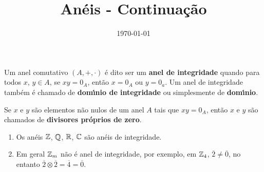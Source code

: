 \documentclass{beamer}
\title{Anéis - Continuação}
\author[\autor]{\autor}
\institute[\instituto]{\instituto}
\date{\today}
\begin{document}
    \begin{frame}
        \maketitle
    \end{frame}

    
    \begin{frame}
        \begin{definicao}
            Um anel comutativo $(A, + , \cdot)$ {\'e} dito ser um \textbf{anel de integridade} quando para todos 
            $x$, $y \in A$, se $xy = 0_A$, ent{\~a}o $x = 0_A$ ou $y = 0_a$. Um anel de integridade tamb{\'e}m {\'e} chamado de \textbf{dom{\'\i}nio de integridade} ou simplesmente de \textbf{dom{\'\i}nio}.
        \end{definicao}

        \begin{observacao}
            Se $x$ e $y$ s{\~a}o elementos n{\~a}o nulos de um anel $A$ tais que $xy = 0_A$, ent{\~a}o $x$ e $y$ s{\~a}o chamados de \textbf{divisores pr{\'o}prios de zero}.
        \end{observacao}
    \end{frame}

    \begin{frame}
        \begin{exemplos}
            \begin{enumerate}[label={\arabic*})]
                \item Os an{\'e}is $\mathbb{Z}$, $\mathbb{Q}$, $\mathbb{R}$, $\mathbb{C}$ s{\~a}o an{\'e}is de integridade.
                
                \vspace{.5cm}

                \item Em geral $\mathbb{Z}_m$ n{\~a}o {\'e} anel de integridade, por exemplo, em $\mathbb{Z}_4$, $\overline{2} \neq \overline{0}$, no entanto $\overline{2}\otimes \overline{2} = \overline{4} = \overline{0}$.

                \vspace{.5cm}

                \seti
            \end{enumerate}
        \end{exemplos}
    \end{frame}
\end{document}
